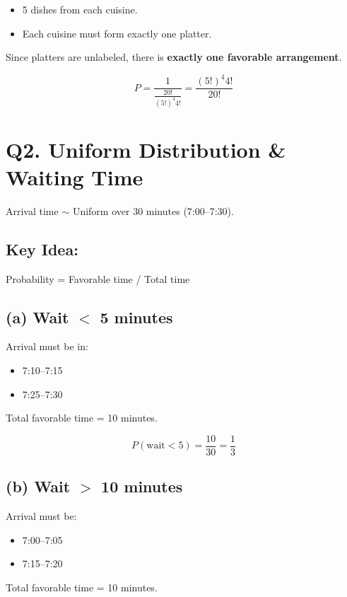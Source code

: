 \documentclass[12pt]{article}
\begin{document}
\begin{itemize}
    \item 5 dishes from each cuisine.
    \item Each cuisine must form exactly one platter.
\end{itemize}

Since platters are unlabeled, there is \textbf{exactly one favorable arrangement}.

\[
P = \frac{1}{\frac{20!}{(5!)^4 4!}} = \frac{(5!)^4 4!}{20!}
\]

\section*{Q2. Uniform Distribution \& Waiting Time}

Arrival time $\sim$ Uniform over 30 minutes (7:00--7:30).

\subsection*{Key Idea:}

Probability = Favorable time / Total time

\subsection*{(a) Wait $<$ 5 minutes}

Arrival must be in:

\begin{itemize}
    \item 7:10--7:15
    \item 7:25--7:30
\end{itemize}

Total favorable time = 10 minutes.

\[
P(\text{wait} < 5) = \frac{10}{30} = \frac{1}{3}
\]

\subsection*{(b) Wait $>$ 10 minutes}

Arrival must be:

\begin{itemize}
    \item 7:00--7:05
    \item 7:15--7:20
\end{itemize}

Total favorable time = 10 minutes.
\end{document}

